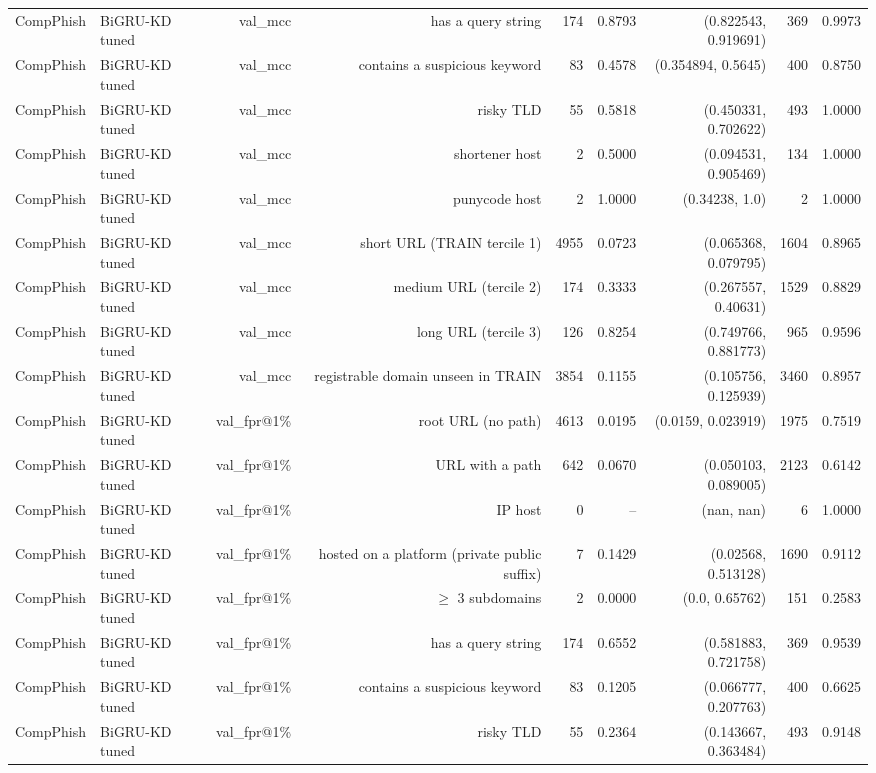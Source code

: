 \begin{table}[t]
\begin{tabular}{llrrrrrrr}
CompPhish & BiGRU-KD tuned & val\_mcc & has a query string & 174 & 0.8793 & (0.822543, 0.919691) & 369 & 0.9973 \\
CompPhish & BiGRU-KD tuned & val\_mcc & contains a suspicious keyword & 83 & 0.4578 & (0.354894, 0.5645) & 400 & 0.8750 \\
CompPhish & BiGRU-KD tuned & val\_mcc & risky TLD & 55 & 0.5818 & (0.450331, 0.702622) & 493 & 1.0000 \\
CompPhish & BiGRU-KD tuned & val\_mcc & shortener host & 2 & 0.5000 & (0.094531, 0.905469) & 134 & 1.0000 \\
CompPhish & BiGRU-KD tuned & val\_mcc & punycode host & 2 & 1.0000 & (0.34238, 1.0) & 2 & 1.0000 \\
CompPhish & BiGRU-KD tuned & val\_mcc & short URL (TRAIN tercile 1) & 4955 & 0.0723 & (0.065368, 0.079795) & 1604 & 0.8965 \\
CompPhish & BiGRU-KD tuned & val\_mcc & medium URL (tercile 2) & 174 & 0.3333 & (0.267557, 0.40631) & 1529 & 0.8829 \\
CompPhish & BiGRU-KD tuned & val\_mcc & long URL (tercile 3) & 126 & 0.8254 & (0.749766, 0.881773) & 965 & 0.9596 \\
CompPhish & BiGRU-KD tuned & val\_mcc & registrable domain unseen in TRAIN & 3854 & 0.1155 & (0.105756, 0.125939) & 3460 & 0.8957 \\
CompPhish & BiGRU-KD tuned & val\_fpr@1\% & root URL (no path) & 4613 & 0.0195 & (0.0159, 0.023919) & 1975 & 0.7519 \\
CompPhish & BiGRU-KD tuned & val\_fpr@1\% & URL with a path & 642 & 0.0670 & (0.050103, 0.089005) & 2123 & 0.6142 \\
CompPhish & BiGRU-KD tuned & val\_fpr@1\% & IP host & 0 & -- & (nan, nan) & 6 & 1.0000 \\
CompPhish & BiGRU-KD tuned & val\_fpr@1\% & hosted on a platform (private public suffix) & 7 & 0.1429 & (0.02568, 0.513128) & 1690 & 0.9112 \\
CompPhish & BiGRU-KD tuned & val\_fpr@1\% & $\geq$ 3 subdomains & 2 & 0.0000 & (0.0, 0.65762) & 151 & 0.2583 \\
CompPhish & BiGRU-KD tuned & val\_fpr@1\% & has a query string & 174 & 0.6552 & (0.581883, 0.721758) & 369 & 0.9539 \\
CompPhish & BiGRU-KD tuned & val\_fpr@1\% & contains a suspicious keyword & 83 & 0.1205 & (0.066777, 0.207763) & 400 & 0.6625 \\
CompPhish & BiGRU-KD tuned & val\_fpr@1\% & risky TLD & 55 & 0.2364 & (0.143667, 0.363484) & 493 & 0.9148 \\

\end{tabular}
\end{table}
